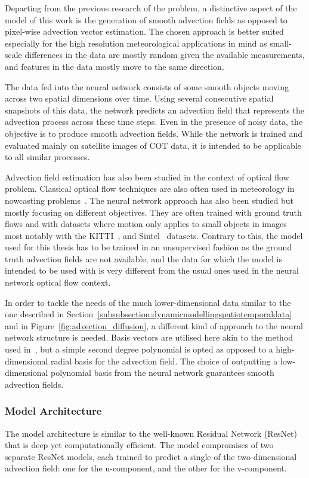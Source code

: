 Departing from the previous research of the problem, a distinctive aspect of the model of this work is the generation of smooth advection fields as opposed to pixel-wise advection vector estimation.
The chosen approach is better suited especially for the high resolution meteorological applications in mind as small-scale differences in the data are mostly random given the available measurements, and features in the data mostly move to the same direction.

The data fed into the neural network consists of some smooth objects moving across two spatial dimensions over time.
Using several consecutive spatial snapshots of this data, the network predicts an advection field that represents the advection process across these time steps.
Even in the presence of noisy data, the objective is to produce smooth advection fields.
While the network is trained and evaluated mainly on satellite images of COT data, it is intended to be applicable to all similar processes.

Advection field estimation has also been studied in the context of optical flow problem.
Classical optical flow techniques are also often used in meteorology in nowcasting problems~\cite{pulkkinenetal}.
The neural network approach has also been studied but mostly focusing on different objectives.
They are often trained with ground truth flows and with datasets where motion only applies to small objects in images most notably with the KITTI~\cite{kitti}, and Sintel~\cite{sintel} datasets.
Contrary to this, the model used for this thesis has to be trained in an unsupervised fashion as the ground truth advection fields are not available, and the data for which the model is intended to be used with is very different from the usual ones used in the neural network optical flow context.

In order to tackle the needs of the much lower-dimensional data similar to the one described in Section~\ref{subsubsection:dynamicmodellingspatiotemporaldata} and in Figure~\ref{fig:advection_diffusion}, a different kind of approach to the neural network structure is needed.
Basis vectors are utilised here akin to the method used in~\cite{deepide}, but a simple second degree polynomial is opted as opposed to a high-dimensional radial basis for the advection field.
The choice of outputting a low-dimensional polynomial basis from the neural network guarantees smooth advection fields. 

\subsubsection{Model Architecture}
The model architecture is similar to the well-known Residual Network (ResNet) that is deep yet computationally efficient.
The model compromises of two separate ResNet models, each trained to predict a single of the two-dimensional advection field: one for the u-component, and the other for the v-component.

